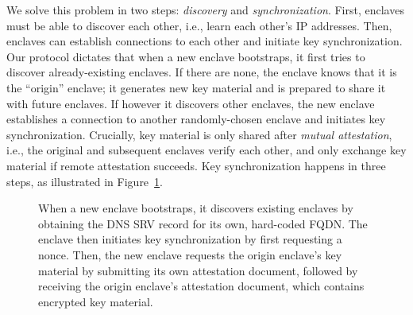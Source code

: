 We solve this problem in two steps: \emph{discovery} and
\emph{synchronization}.  First, enclaves must be able to discover each other,
i.e., learn each other's IP addresses.  Then, enclaves can establish
connections to each other and initiate key synchronization.  Our protocol
dictates that when a new enclave bootstraps, it first tries to discover
already-existing enclaves.  If there are none, the enclave knows that it is the
``origin'' enclave; it generates new key material and is prepared to share it
with future enclaves.  If however it discovers other enclaves, the new enclave
establishes a connection to another randomly-chosen enclave and initiates key
synchronization.  Crucially, key material is only shared after \emph{mutual
attestation}, i.e., the original and subsequent enclaves verify each other, and
only exchange key material if remote attestation succeeds.  Key synchronization
happens in three steps, as illustrated in Figure~\ref{fig:key-synchronization}.

\begin{figure}[t]
  \centering
  
  \caption{When a new enclave bootstraps, it discovers existing enclaves by
    obtaining the DNS SRV record for its own, hard-coded FQDN.  The enclave then
    initiates key synchronization by first requesting a nonce.  Then, the new
    enclave requests the origin enclave's key material by submitting its own
    attestation document, followed by receiving the origin enclave's attestation
    document, which contains encrypted key material.}
  \label{fig:key-synchronization}
\end{figure}

